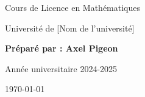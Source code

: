\begin{titlepage}
    \centering
    \vspace*{2cm}

    \Huge
    Cours de Licence en Mathématiques

    \vspace{0.5cm}

    \LARGE
    Université de [Nom de l'université]

    \vspace{1.5cm}

    \textbf{Préparé par : Axel Pigeon}

    \vfill

    \Large
    Année universitaire 2024-2025

    \vspace{0.8cm}

    \today
\end{titlepage}
